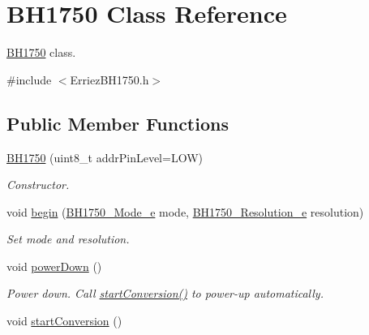 \hypertarget{class_b_h1750}{}\section{B\+H1750 Class Reference}
\label{class_b_h1750}


\hyperlink{class_b_h1750}{B\+H1750} class.  




{\ttfamily \#include $<$Erriez\+B\+H1750.\+h$>$}

\subsection*{Public Member Functions}
\begin{DoxyCompactItemize}
\item 
\hyperlink{class_b_h1750_aa0f66027401db3cd8eb849456b820c39}{B\+H1750} (uint8\+\_\+t addr\+Pin\+Level=L\+OW)
\begin{DoxyCompactList}\small\item\em Constructor. \end{DoxyCompactList}\item 
void \hyperlink{class_b_h1750_aa32b8ff6bf4d7888f776bc42303075a2}{begin} (\hyperlink{_erriez_b_h1750_8h_adcb5f510996efd1d596b2e65ffc7892b}{B\+H1750\+\_\+\+Mode\+\_\+e} mode, \hyperlink{_erriez_b_h1750_8h_a596339813d6a64d82e6477f6b7825b3d}{B\+H1750\+\_\+\+Resolution\+\_\+e} resolution)
\begin{DoxyCompactList}\small\item\em Set mode and resolution. \end{DoxyCompactList}\item 
void \hyperlink{class_b_h1750_ae9c0efac4daa5a16c1a732c0aafbc6c0}{power\+Down} ()\hypertarget{class_b_h1750_ae9c0efac4daa5a16c1a732c0aafbc6c0}{}\label{class_b_h1750_ae9c0efac4daa5a16c1a732c0aafbc6c0}

\begin{DoxyCompactList}\small\item\em Power down. Call \hyperlink{class_b_h1750_ae637c8d230c873bc22ee836a7f878dfe}{start\+Conversion()} to power-\/up automatically. \end{DoxyCompactList}\item 
void \hyperlink{class_b_h1750_ae637c8d230c873bc22ee836a7f878dfe}{start\+Conversion} ()\hypertarget{class_b_h1750_ae637c8d230c873bc22ee836a7f878dfe}{}\label{class_b_h1750_ae637c8d230c873bc22ee836a7f878dfe}


\end{DoxyCompactItemize}

